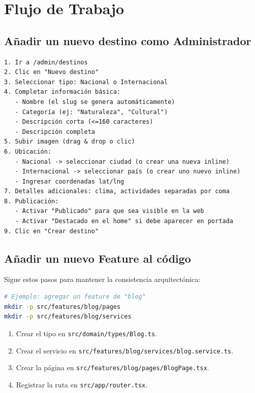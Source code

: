 \documentclass[12pt,letterpaper]{article}
\newcommand{\code}[1]{\texttt{#1}}
\begin{document}
\section{Flujo de Trabajo}

\subsection{Añadir un nuevo destino como Administrador}

\begin{lstlisting}[language={}]
1. Ir a /admin/destinos
2. Clic en "Nuevo destino"
3. Seleccionar tipo: Nacional o Internacional
4. Completar información básica:
   - Nombre (el slug se genera automáticamente)
   - Categoría (ej: "Naturaleza", "Cultural")
   - Descripción corta (<=160 caracteres)
   - Descripción completa
5. Subir imagen (drag & drop o clic)
6. Ubicación:
   - Nacional -> seleccionar ciudad (o crear una nueva inline)
   - Internacional -> seleccionar país (o crear uno nuevo inline)
   - Ingresar coordenadas lat/lng
7. Detalles adicionales: clima, actividades separadas por coma
8. Publicación:
   - Activar "Publicado" para que sea visible en la web
   - Activar "Destacado en el home" si debe aparecer en portada
9. Clic en "Crear destino"
\end{lstlisting}

\subsection{Añadir un nuevo Feature al código}

Sigue estos pasos para mantener la consistencia arquitectónica:

\begin{lstlisting}[language=bash]
# Ejemplo: agregar un feature de "blog"
mkdir -p src/features/blog/pages
mkdir -p src/features/blog/services
\end{lstlisting}

\begin{enumerate}
    \item Crear el tipo en \code{src/domain/types/Blog.ts}.
    \item Crear el servicio en \code{src/features/blog/services/blog.service.ts}.
    \item Crear la página en \code{src/features/blog/pages/BlogPage.tsx}.
    \item Registrar la ruta en \code{src/app/router.tsx}.
\end{enumerate}
\end{document}

